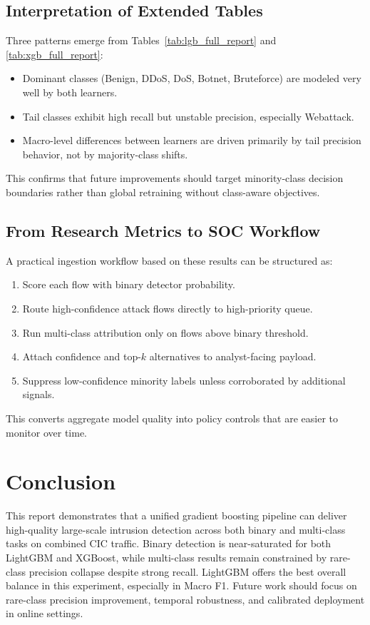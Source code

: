 \documentclass[10pt,journal]{IEEEtran}
\begin{document}
\subsection{Interpretation of Extended Tables}
Three patterns emerge from Tables~\ref{tab:lgb_full_report} and \ref{tab:xgb_full_report}:
\begin{itemize}
\item Dominant classes (Benign, DDoS, DoS, Botnet, Bruteforce) are modeled very well by both learners.
\item Tail classes exhibit high recall but unstable precision, especially Webattack.
\item Macro-level differences between learners are driven primarily by tail precision behavior, not by majority-class shifts.
\end{itemize}

This confirms that future improvements should target minority-class decision boundaries rather than global retraining without class-aware objectives.

\subsection{From Research Metrics to SOC Workflow}
A practical ingestion workflow based on these results can be structured as:
\begin{enumerate}
\item Score each flow with binary detector probability.
\item Route high-confidence attack flows directly to high-priority queue.
\item Run multi-class attribution only on flows above binary threshold.
\item Attach confidence and top-$k$ alternatives to analyst-facing payload.
\item Suppress low-confidence minority labels unless corroborated by additional signals.
\end{enumerate}

This converts aggregate model quality into policy controls that are easier to monitor over time.

\section{Conclusion}
This report demonstrates that a unified gradient boosting pipeline can deliver high-quality large-scale intrusion detection across both binary and multi-class tasks on combined CIC traffic. Binary detection is near-saturated for both LightGBM and XGBoost, while multi-class results remain constrained by rare-class precision collapse despite strong recall. LightGBM offers the best overall balance in this experiment, especially in Macro F1. Future work should focus on rare-class precision improvement, temporal robustness, and calibrated deployment in online settings.
\end{document}
